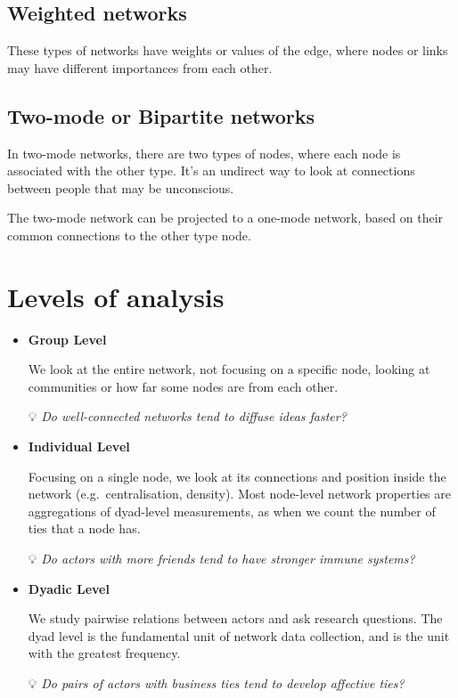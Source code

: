 \documentclass[
  notitlepage,
  onecolumn,
  openany]{book}
\begin{document}
\hypertarget{weighted-networks}{%
\subsection{Weighted networks}\label{weighted-networks}}

These types of networks have weights or values of the edge, where nodes or links may have different importances from each other.

\hypertarget{two-mode-or-bipartite-networks}{%
\subsection{Two-mode or Bipartite networks}\label{two-mode-or-bipartite-networks}}

In two-mode networks, there are two types of nodes, where each node is associated with the other type. It's an undirect way to look at connections between people that may be unconscious.

The two-mode network can be projected to a one-mode network, based on their common connections to the other type node.

\hypertarget{levels-of-analysis}{%
\section{Levels of analysis}\label{levels-of-analysis}}

\begin{itemize}
\item
  \textbf{Group Level}

  We look at the entire network, not focusing on a specific node, looking at communities or how far some nodes are from each other.

  💡 \emph{Do well-connected networks tend to diffuse ideas faster?}
\item
  \textbf{Individual Level}

  Focusing on a single node, we look at its connections and position inside the network (e.g.~centralisation, density). Most node-level network properties are aggregations of dyad-level measurements, as when we count the number of ties that a node has.

  💡 \emph{Do actors with more friends tend to have stronger immune systems?}
\item
  \textbf{Dyadic Level}

  We study pairwise relations between actors and ask research questions. The dyad level is the fundamental unit of network data collection, and is the unit with the greatest frequency.

  💡 \emph{Do pairs of actors with business ties tend to develop affective ties?}
\end{itemize}
\end{document}
